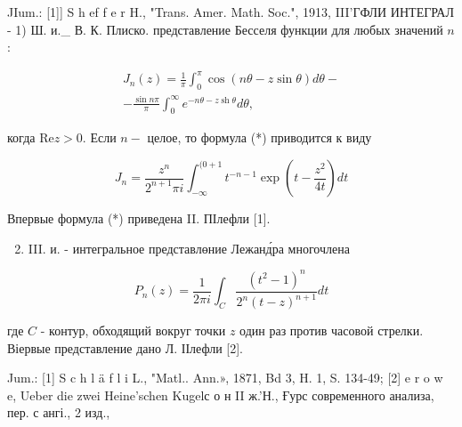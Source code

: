\documentclass[10pt]{article}
\begin{document}
JIum.: [1]] S h ef f e r H., "Trans. Amer. Math. Soc.", 1913, III'ГФЛИ ИНТЕГРАЛ - 1) Ш. и.\_ В. К. Плиско. представление Бесселя функции для любых значений $n$ :



\[

\begin{gathered}

J_{n}(z)=\frac{1}{\pi} \int_{0}^{\pi} \cos (n \theta-z \sin \theta) d \theta- \\

-\frac{\sin n \pi}{\pi} \int_{0}^{\infty} e^{-n \theta-z \operatorname{sh} \theta} d \theta,

\end{gathered}

\]



когда $\mathrm{Re} z>0$. Если $n-$ целое, то формула (*) приводится к виду



\[

J_{n}=\frac{z^{n}}{2^{n+1} \pi i} \int_{-\infty}^{(0+1} t^{-n-1} \exp \left(t-\frac{z^{2}}{4 t}\right) d t

\]



Впервые формула (*) приведена II. ПІлефли [1].



\begin{enumerate}

  \setcounter{enumi}{1}

  \item III. и. - интегральное представлөние Лежанд́ра многочлена

\end{enumerate}



\[

P_{n}(z)=\frac{1}{2 \pi i} \int_{C} \frac{\left(t^{2}-1\right)^{n}}{2^{n}(t-z)^{n+1}} d t

\]



где $C$ - контур, обходящий вокруг точки $z$ один раз против часовой стрелки. Віервые представление дано Л. ІІлефли [2].



Jum.: [1] S c h l ä f l i L., "Matl.. Ann.», 1871, Bd 3, H. 1, S. 134-49; [2] e r o w e, Ueber die zwei Heine'schen Kugelс о н II ж.'Н., Ғурс современного анализа, пер. с ангі., 2 изд.,
\end{document}
